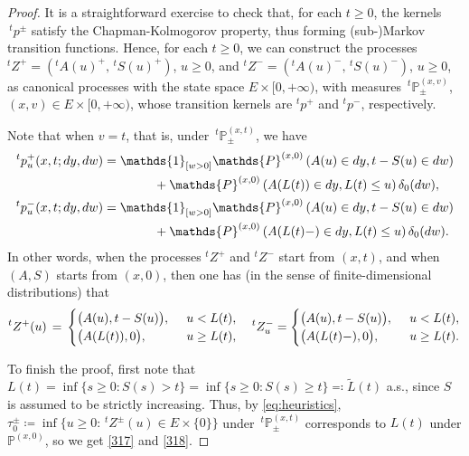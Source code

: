 \documentclass[reqno]{amsart}
\theoremstyle{remark}
\numberwithin{equation}{section} %
\newcommand{\PP}{\mathds{P}}
\newcommand{\wt}{\widetilde}
\newcommand{\1}{\mathds{1}}
\begin{document}
	\begin{proof}
		It is a straightforward exercise to check that, for each $t\ge 0$, the kernels $\,^tp^{\pm}$ satisfy the Chapman-Kolmogorov property, thus forming (sub-)Markov transition functions. Hence, for each $t\ge0$, we can construct the processes $^tZ^+=(^tA(u)^+, \,^tS(u)^+)$,  $u\ge0$, and $^tZ^-=(^tA(u)^-, \,^tS(u)^-)$,  $u\ge0$, as canonical processes with the state space $E \times [0, +\infty)$, with measures $\,^t\mathds{P}_\pm^{(x,v)}$, $(x,v)\in E\times [0,+\infty)$, whose transition kernels are $^tp^+$ and $^tp^-$, respectively.
		
		Note that when $v=t$, that is, under $\,^t\mathds{P}_\pm^{(x,t)}$, we have
		\begin{align}
			^t p^+_u(x,t;dy,dw) & =  \mathds{1}_{[w>0]} \mathds{P}^{(x,0)} \left( A(u) \in dy, t-S(u) \in dw  \right) \notag \\ &\hspace{4em}+\mathds{P}^{(x,0)} \left( A(L(t)) \in dy, L(t) \leq u \right)\delta_0(dw), \\
			^tp^-_u(x,t;dy, dw)&= \mathds{1}_{[w>0]} \mathds{P}^{(x,0)} \left( A(u) \in dy, t-S(u) \in dw \right) \notag \\ &\hspace{4em}+ \mathds{P}^{(x,0)} \left( A(L(t)-)  \in dy, L(t) \leq u \right) \delta_0(dw).
		\end{align}
		In other words, when the processes $^tZ^+$ and $^tZ^-$ start from $(x,t)$, and when $(A,S)$ starts from $(x,0)$, then one has (in the sense of finite-dimensional distributions) that
		\begin{align}\label{eq:heuristics}
			^tZ^+(u)\, = \, \begin{cases}
				\big(A(u), t-S(u)\big), \enskip & u < L(t), \\ \big(A(L(t)),0\big), & u \geq  L(t),
			\end{cases} \quad ^tZ^-_u = \begin{cases}
				\big(A(u), t-S(u)\big), \enskip & u < L(t), \\ \big(A(L(t)-),0\big), & u \geq  L(t).
			\end{cases} 
		\end{align}
		
		To finish the proof, first note that $L(t)=\inf\{s\ge0:S(s)>t\}=\inf\{s\ge0:S(s)\ge t\}\eqqcolon \wt L(t)$ a.s., since $S$ is assumed to be strictly increasing. Thus, by \eqref{eq:heuristics}, $\tau^{\pm}_0 \coloneqq \inf \{ u \geq 0 : \,^tZ^{\pm}(u) \in E \times \{ 0 \} \}$ under $\,^t\mathds{P}_\pm^{(x,t)}$ corresponds to  $L(t)$ under $\PP^{(x,0)}$, so we get \eqref{317} and \eqref{318}.    
	\end{proof}
	
\end{document}
